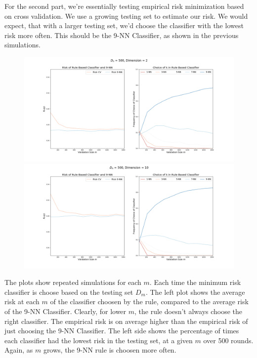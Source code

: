 \documentclass[a4paper, 11pt]{article} %
\begin{document}
For the second part, we're essentially testing empirical risk minimization based on cross validation. We use a growing testing set to estimate our risk. We would expect, that with a larger testing set, we'd choose the classifier with the lowest risk more often. This should be the 9-NN Classifier, as shown in the previous simulations. 

\begin{figure}[H]
\centering
\includegraphics[scale= 0.3]{CV_KNN_n500_d2}
\includegraphics[scale= 0.3]{CV_KNN_n500_d10}
\end{figure}

The plots show repeated simulations for each $m$. Each time the minimum risk classifier is choose based on the testing set $D_m$. The left plot shows the average risk at each $m$ of the classifier choosen by the rule, compared to the average risk of the 9-NN Classifier. Clearly, for lower $m$, the rule doesn't always choose the right classifier. The empirical risk is on average higher than the empirical risk of just choosing the 9-NN Classifier. The left side shows the percentage of times each classifier had the lowest risk in the testing set, at a given $m$ over 500 rounds. Again, as $m$ grows, the 9-NN rule is choosen more often. \\
\end{document}
